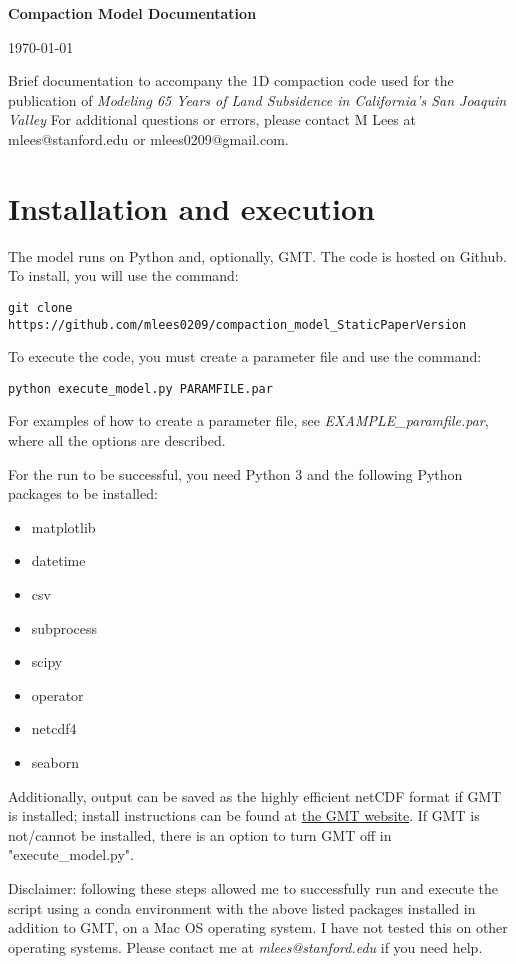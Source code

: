 \documentclass{article}
\begin{document}
\LARGE\textbf{Compaction Model Documentation}
\normalsize

\today
\author{Matt Lees\n mlees0209@gmail.com}

\abstract Brief documentation to accompany the 1D compaction code used for the publication of \textit{Modeling 65 Years of Land Subsidence in California’s San Joaquin Valley} For additional questions or errors, please contact M Lees at mlees@stanford.edu or mlees0209@gmail.com.

\tableofcontents

\section{Installation and execution}

The model runs on Python and, optionally, GMT. The code is hosted on Github. To install, you will use the command:

\verb|git clone https://github.com/mlees0209/compaction_model_StaticPaperVersion|

To execute the code, you must create a parameter file and use the command:

\verb|python execute_model.py PARAMFILE.par|

For examples of how to create a parameter file, see \textit{EXAMPLE\_paramfile.par}, where all the options are described.

For the run to be successful, you need Python 3 and the following Python packages to be installed:
\begin{itemize}
\item matplotlib
\item datetime
\item csv
\item subprocess
\item scipy
\item operator
\item netcdf4
\item seaborn
\end{itemize}

Additionally, output can be saved as the highly efficient netCDF format if GMT is installed; install instructions can be found at  \href{https://www.generic-mapping-tools.org/}{the GMT website}. If GMT is not/cannot be installed, there is an option to turn GMT off in "execute\_model.py".

Disclaimer: following these steps allowed me to successfully run and execute the script using a conda environment with the above listed packages installed in addition to GMT, on a Mac OS operating system. I have not tested this on other operating systems. Please contact me at \textit{mlees@stanford.edu} if you need help.
\end{document}
